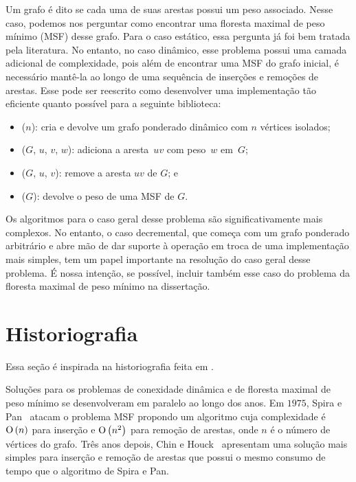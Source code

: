 {
Um grafo é dito  se cada uma de suas arestas possui um peso associado. Nesse caso, podemos nos perguntar como encontrar uma floresta maximal de peso mínimo (MSF) desse grafo. Para o caso estático, essa pergunta já foi bem tratada pela literatura. No entanto, no caso dinâmico, esse problema possui uma camada adicional de complexidade, pois além de encontrar uma MSF do grafo inicial, é necessário mantê-la ao longo de uma sequência de inserções e remoções de arestas. Esse  pode ser reescrito como desenvolver uma implementação tão eficiente quanto possível para a seguinte biblioteca:
\begin{itemize}
\item \MSFCreate($n$): cria e devolve um grafo ponderado dinâmico com $n$ vértices isolados;
\item \MSFaddEdge($G$, $u$, $v$, $w$): adiciona a aresta~$uv$ com peso~$w$ em~$G$;
\item \MSFdelEdge($G$, $u$, $v$): remove a aresta $uv$ de $G$; e
\item \MSFweight($G$): devolve o peso de uma MSF de $G$.
\end{itemize}
}

Os algoritmos para o caso geral desse problema são significativamente mais complexos. No entanto, o caso decremental, que começa com um grafo ponderado arbitrário e abre mão de dar suporte à operação \MSFaddEdge{} em troca de uma implementação mais simples, tem um papel importante na resolução do caso geral desse problema.  É nossa intenção, se possível, incluir também esse caso do problema da floresta maximal de peso mínimo na dissertação.

\section{Historiografia}

Essa seção é inspirada na historiografia feita em \cite{QC22, HHSRecentAdvances2022, bruceM}.

Soluções para os problemas de conexidade dinâmica e de floresta maximal de peso mínimo se desenvolveram em paralelo ao longo dos anos. Em $1975$, Spira e Pan~\cite{SP1975} atacam o problema MSF propondo um algoritmo cuja complexidade é $\text{O}\left(n\right)$ para inserção e $\text{O}\left(n^2\right)$ para remoção de arestas, onde $n$ é o número de vértices do grafo. Três anos depois, Chin e Houck~\cite{CH1978} apresentam uma solução mais simples para inserção e remoção de arestas que possui o mesmo consumo de tempo que o algoritmo de Spira e Pan.

